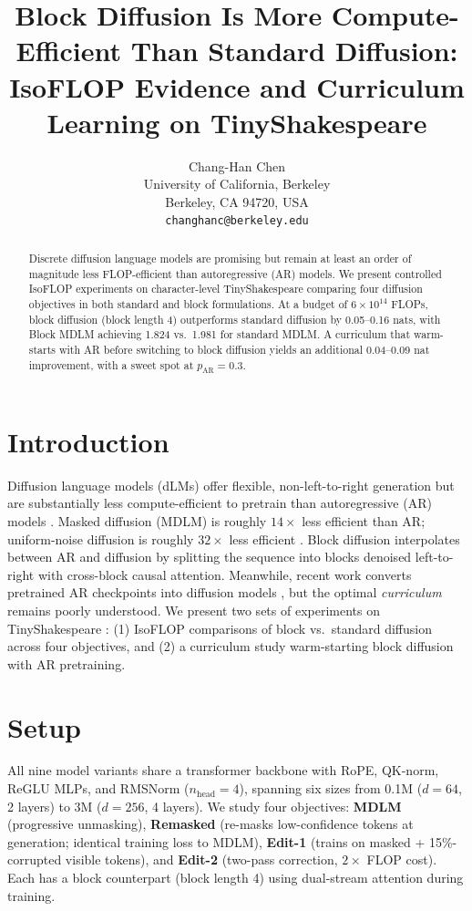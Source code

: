 \documentclass{article}
\title{Block Diffusion Is More Compute-Efficient Than Standard Diffusion: \\
IsoFLOP Evidence and Curriculum Learning on TinyShakespeare}
\author{Chang-Han Chen \\
University of California, Berkeley\\
Berkeley, CA 94720, USA \\
\texttt{changhanc@berkeley.edu}
}
\begin{document}
\maketitle

\begin{abstract}
Discrete diffusion language models are promising but remain at least an order of magnitude less FLOP-efficient than autoregressive (AR) models.
We present controlled IsoFLOP experiments on character-level TinyShakespeare comparing four diffusion objectives in both standard and block formulations.
At a budget of $6 \times 10^{14}$ FLOPs, block diffusion (block length 4) outperforms standard diffusion by 0.05--0.16 nats, with Block MDLM achieving 1.824 vs.\ 1.981 for standard MDLM.
A curriculum that warm-starts with AR before switching to block diffusion yields an additional 0.04--0.09 nat improvement, with a sweet spot at $p_{\mathrm{AR}} = 0.3$.
\end{abstract}

\section{Introduction}

Diffusion language models (dLMs) offer flexible, non-left-to-right generation but are substantially less compute-efficient to pretrain than autoregressive (AR) models \citep{sahoo2024simple, shi2024simplified}.
Masked diffusion (MDLM) is roughly $14\times$ less efficient than AR; uniform-noise diffusion is roughly $32\times$ less efficient \citep{nie2025scaling}.
Block diffusion \citep{arriola2025block} interpolates between AR and diffusion by splitting the sequence into blocks denoised left-to-right with cross-block causal attention.
Meanwhile, recent work converts pretrained AR checkpoints into diffusion models \citep{sdar2025, nbdiff2025, dream2025, llada2025}, but the optimal \emph{curriculum} remains poorly understood.
We present two sets of experiments on TinyShakespeare \citep{tinyshakespeare}: (1) IsoFLOP comparisons of block vs.\ standard diffusion across four objectives, and (2) a curriculum study warm-starting block diffusion with AR pretraining.

\section{Setup}

All nine model variants share a transformer backbone with RoPE, QK-norm, ReGLU MLPs, and RMSNorm ($n_{\text{head}}{=}4$), spanning six sizes from 0.1M ($d{=}64$, 2 layers) to 3M ($d{=}256$, 4 layers).
We study four objectives: \textbf{MDLM} (progressive unmasking), \textbf{Remasked} (re-masks low-confidence tokens at generation; identical training loss to MDLM), \textbf{Edit-1} (trains on masked + 15\%-corrupted visible tokens), and \textbf{Edit-2} (two-pass correction, $2\times$ FLOP cost).
Each has a block counterpart (block length 4) using dual-stream attention during training.
\end{document}

